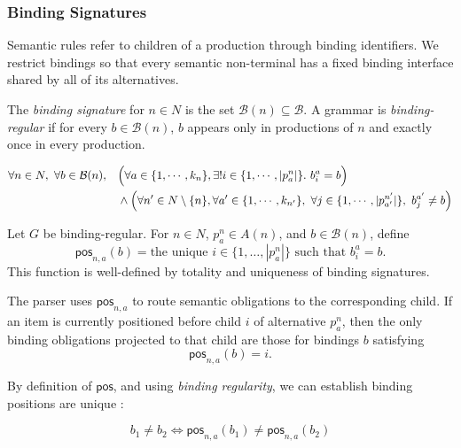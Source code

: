 \subsubsection{Binding Signatures}
\label{binding}

Semantic rules refer to children of a production through binding identifiers.
We restrict bindings so that every semantic non-terminal has a fixed binding
interface shared by all of its alternatives.

\begin{definition}

The \emph{binding signature} for $n \in N$ is the set $\mathcal{B}(n) \subseteq \mathcal B$. 
A grammar is \emph{binding-regular} if for every \(b \in \mathcal B(n)\), $b$ appears only in productions of $n$ and exactly once in every production. 

\[
\begin{aligned}
\forall n \in N,\ \forall b \in \mathcal B(n),\quad
&\Bigl(
  \forall a \in \{1,\cdots,k_n\},
  \exists! i \in \{1,\cdots,|p_a^n|\}.\ b^a_i = b
\Bigr)
\\
&{}\land
\Bigl(
  \forall n' \in N \setminus \{n\},
  \forall a' \in \{1,\cdots,k_{n'}\},~ \forall j \in \{1,\cdots,|p_{a'}^{n'}|\}, \ b^{a'}_j \neq b
\Bigr)
\end{aligned}
\]
\end{definition}

\begin{definition}
Let \(G\) be binding-regular. For \(n \in N\), \(p^n_a \in A(n)\), and
\(b \in \mathcal{B}(n)\), define
\[
    \mathsf{pos}_{n,a}(b)
    =
    \text{the unique } i \in \{1,\ldots,|p^n_a|\}
    \text{ such that } b^a_i = b .
\]
This function is well-defined by totality and uniqueness of binding signatures.
\end{definition}

The parser uses \(\mathsf{pos}_{n,a}\) to route semantic obligations to the
corresponding child. If an item is currently positioned before child \(i\) of
alternative \(p^n_a\), then the only binding obligations projected to that child
are those for bindings \(b\) satisfying
\[
    \mathsf{pos}_{n,a}(b) = i .
\]

\begin{property}
\label{prop:binding-uniqueness}
By definition of $\mathsf{pos}$, and using \emph{binding regularity}, we can establish binding positions are unique :

$$
b_1 \neq b_2 \iff \mathsf{pos}_{n,a}(b_1) \neq \mathsf{pos}_{n,a}(b_2)
$$
\end{property}

